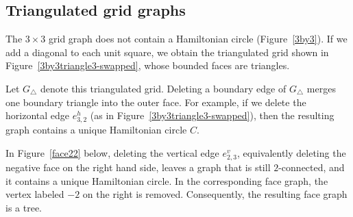 \documentclass[12pt]{amsart}
\theoremstyle{theorem}%
\theoremstyle{definition}%
\begin{document}
\subsection{Triangulated grid graphs}

The $3\times 3$ grid graph does not contain a Hamiltonian circle (Figure~\ref{3by3}).
If we add a diagonal to each unit square, we obtain the triangulated grid shown in
Figure~\ref{3by3triangle3-swapped}, whose bounded faces are triangles.

Let $G_\triangle$ denote this triangulated grid.  Deleting a boundary edge of $G_\triangle$
merges one boundary triangle into the outer face.  For example, if we delete the horizontal edge
$e^h_{3,2}$ (as in Figure~\ref{3by3triangle3-swapped}), then the resulting graph contains a unique
Hamiltonian circle $C$.




In Figure~\ref{face22} below, deleting the vertical edge $e^v_{2,3}$, equivalently deleting the negative face on the right hand side, leaves a graph that is still $2$-connected, and it contains a unique Hamiltonian circle.
In the corresponding face graph, the vertex labeled $-2$ on the right is removed.
Consequently, the resulting face graph is a tree.
\end{document}

